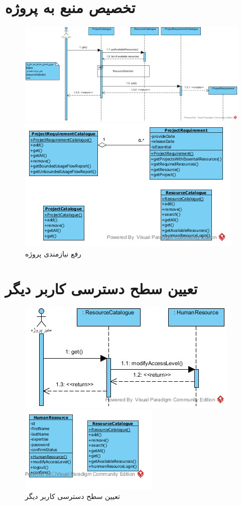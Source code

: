 \section{تخصیص منبع به پروژه}
\begin{figure}[H]
	\centering
	\includegraphics[scale=0.7]{img/sequence-analysis/AllocateResourceToProject}
	
	
	\includegraphics[scale=0.8]{img/sequence-analysis/AllocateResourceToProjectC}
	\caption{رفع نیازمندی پروژه}
\end{figure}

\section{تعیین سطح دسترسی کاربر دیگر}
\begin{figure}[H]
	\centering
	\includegraphics[scale=1]{img/sequence-analysis/SetUserAccessLevel}
	
	
	\includegraphics[scale=1]{img/sequence-analysis/SetUserAccessLevelC}
		\caption{تعیین سطح دسترسی کاربر دیگر}
\end{figure}


